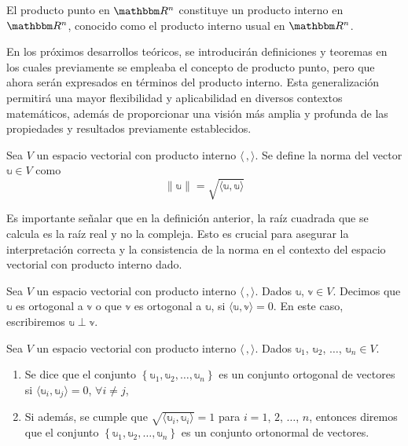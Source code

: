 \newpage

\begin{observation}
    El producto punto en $\RR[n]$ constituye un producto interno en $\RR[n]$, conocido como el producto interno usual en $\RR[n]$.
\end{observation}

En los próximos desarrollos teóricos, se introducirán definiciones y teoremas en los cuales previamente se empleaba el concepto de producto punto, pero que ahora serán expresados en términos del producto interno. Esta generalización permitirá una mayor flexibilidad y aplicabilidad en diversos contextos matemáticos, además de proporcionar una visión más amplia y profunda de las propiedades y resultados previamente establecidos.

\begin{definition}
    Sea $V$ un espacio vectorial con producto interno $\langle \, , \rangle$. Se define la norma del vector $\mathbb{u} \in V$ como
    $$\| \mathbb{u} \| = \sqrt{\langle \mathbb{u}, \mathbb{u} \rangle}$$
\end{definition}

\begin{observation}
    Es importante señalar que en la definición anterior, la raíz cuadrada que se calcula es la raíz real y no la compleja. Esto es crucial para asegurar la interpretación correcta y la consistencia de la norma en el contexto del espacio vectorial con producto interno dado.
\end{observation}

\begin{definition}\label{orto_prodinterno}
    Sea $V$ un espacio vectorial con producto interno $\langle \, , \rangle$. Dados $\mathbb{u}$, $\mathbb{v} \in V$. Decimos que $\mathbb{u}$ es ortogonal a $\mathbb{v}$ o que $\mathbb{v}$ es ortogonal a $\mathbb{u}$, si $\langle \mathbb{u}, \mathbb{v} \rangle = 0$. En este caso, escribiremos $\mathbb{u} \perp \mathbb{v}$.
\end{definition}

\begin{definition}
    Sea $V$ un espacio vectorial con producto interno $\langle \, , \rangle$. Dados $\mathbb{u}_1$, $\mathbb{u}_2$, $\dots$, $\mathbb{u}_n \in V$.
    \begin{enumerate}[label=\roman*)]
        \item Se dice que el conjunto $\left\{ \mathbb{u}_1, \mathbb{u}_2, \dots, \mathbb{u}_n \right\}$ es un conjunto ortogonal de vectores si $\langle \mathbb{u}_i, \mathbb{u}_j \rangle = 0$, $\forall i \neq j$,
        \item Si además, se cumple que $\sqrt{\langle \mathbb{u}_i, \mathbb{u}_i \rangle} = 1$ para $i = 1$, $2$, $\dots$, $n$, entonces diremos que el conjunto $\left\{ \mathbb{u}_1, \mathbb{u}_2, \dots, \mathbb{u}_n \right\}$ es un conjunto ortonormal de vectores.
    \end{enumerate}
\end{definition}

